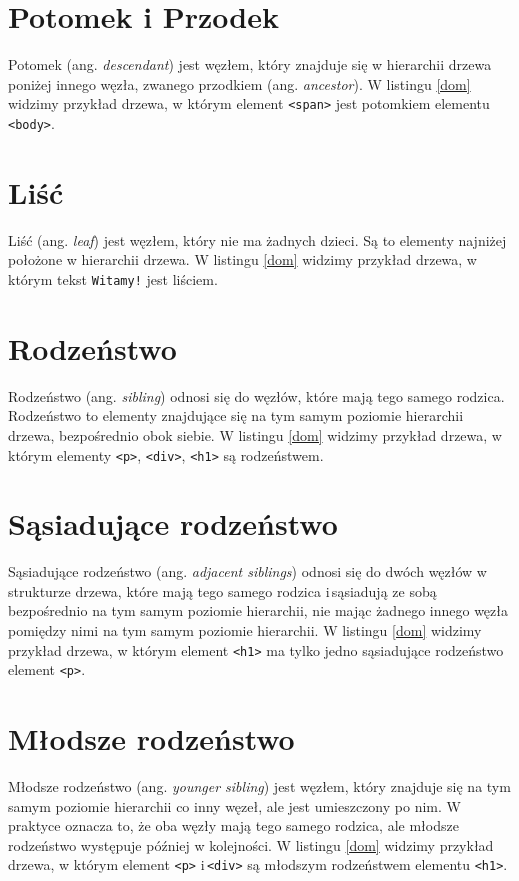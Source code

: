 \documentclass[a4paper,12pt]{book} %
\begin{document}
\section{Potomek i Przodek}
Potomek (ang. \emph{descendant}) jest węzłem, który znajduje się w hierarchii drzewa poniżej innego węzła, zwanego przodkiem (ang. \emph{ancestor}). W listingu \ref{dom} widzimy przykład drzewa, w którym element \lstinline|<span>| jest potomkiem elementu \lstinline|<body>|.



\section{Liść}
Liść (ang. \emph{leaf}) jest węzłem, który nie ma żadnych dzieci. Są to elementy najniżej położone w hierarchii drzewa. W listingu \ref{dom} widzimy przykład drzewa, w którym tekst \lstinline|Witamy!| jest liściem.

\section{Rodzeństwo}
Rodzeństwo (ang. \emph{sibling}) odnosi się do węzłów, które mają tego samego rodzica. Rodzeństwo to elementy znajdujące się na tym samym poziomie hierarchii drzewa, bezpośrednio obok siebie. W listingu \ref{dom} widzimy przykład drzewa, w którym elementy \lstinline|<p>|, \lstinline|<div>|, \lstinline|<h1>| są rodzeństwem.

\section{Sąsiadujące rodzeństwo}
Sąsiadujące rodzeństwo (ang. \emph{adjacent siblings}) odnosi się do dwóch węzłów w strukturze drzewa, które mają tego samego rodzica i\,sąsiadują ze sobą bezpośrednio na tym samym poziomie hierarchii, nie mając żadnego innego węzła pomiędzy nimi na tym samym poziomie hierarchii. W listingu \ref{dom} widzimy przykład drzewa, w którym element \lstinline|<h1>| ma tylko jedno sąsiadujące rodzeństwo element \lstinline|<p>|.

\section{Młodsze rodzeństwo}
Młodsze rodzeństwo (ang. \emph{younger sibling}) jest węzłem, który znajduje się na tym samym poziomie hierarchii co inny węzeł, ale jest umieszczony po nim. W praktyce oznacza to, że oba węzły mają tego samego rodzica, ale młodsze rodzeństwo występuje później w kolejności. W listingu \ref{dom} widzimy przykład drzewa, w którym element \lstinline|<p>| i\,\lstinline|<div>| są młodszym rodzeństwem elementu \lstinline|<h1>|.
\end{document}

